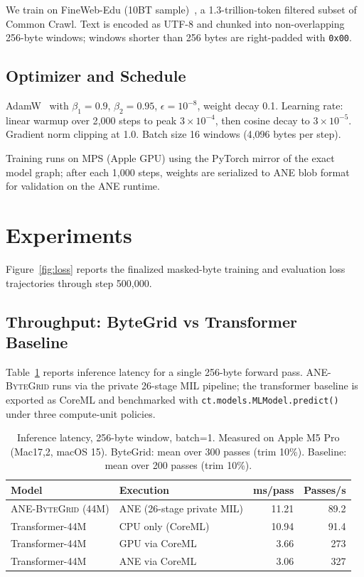 \documentclass[10pt,twocolumn]{article}
\newcommand{\bytegrid}{\textsc{ANE-ByteGrid}}
\begin{document}
We train on FineWeb-Edu (10BT sample)~\cite{TODO_penedo_fineweb}, a
1.3-trillion-token filtered subset of Common Crawl.
Text is encoded as UTF-8 and chunked into non-overlapping 256-byte windows;
windows shorter than 256 bytes are right-padded with \texttt{0x00}.

\subsection{Optimizer and Schedule}

AdamW~\cite{TODO_loshchilov_adamw} with $\beta_1{=}0.9$, $\beta_2{=}0.95$,
$\epsilon{=}10^{-8}$, weight decay 0.1.
Learning rate: linear warmup over 2{,}000 steps to peak $3{\times}10^{-4}$,
then cosine decay to $3{\times}10^{-5}$.
Gradient norm clipping at 1.0.
Batch size 16 windows (4{,}096 bytes per step).

Training runs on MPS (Apple GPU) using the PyTorch mirror of the exact
model graph; after each 1{,}000 steps, weights are serialized to ANE blob
format for validation on the ANE runtime.

\section{Experiments}
\label{sec:experiments}

Figure~\ref{fig:loss} reports the finalized masked-byte training and
evaluation loss trajectories through step 500{,}000.

\subsection{Throughput: ByteGrid vs Transformer Baseline}

Table~\ref{tab:throughput} reports inference latency for a single 256-byte
forward pass.
\bytegrid{} runs via the private 26-stage MIL pipeline;
the transformer baseline is exported as CoreML and benchmarked with
\texttt{ct.models.MLModel.predict()} under three compute-unit policies.

\begin{table}[h]
\centering
\caption{Inference latency, 256-byte window, batch=1.
Measured on Apple M5 Pro (Mac17,2, macOS 15).
ByteGrid: mean over 300 passes (trim 10\%).
Baseline: mean over 200 passes (trim 10\%).}
\label{tab:throughput}
\begin{tabular}{llrr}
\toprule
Model & Execution & ms/pass & Passes/s \\
\midrule
\bytegrid{} (44M)        & ANE (26-stage private MIL) & 11.21 & 89.2 \\
Transformer-44M          & CPU only (CoreML)          & 10.94 & 91.4 \\
Transformer-44M          & GPU via CoreML             &  3.66 & 273 \\
Transformer-44M          & ANE via CoreML             &  3.06 & 327 \\
\bottomrule
\end{tabular}
\end{table}
\end{document}
